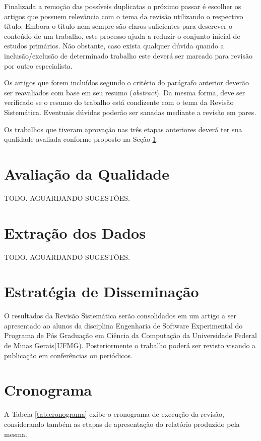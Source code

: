 \documentclass{article}
\begin{document}
Finalizada a remoção das possíveis duplicatas o próximo passar é escolher os
artigos que possuem relevância com o tema da revisão utilizando o respectivo
título. Embora o título nem sempre são claros suficientes para  descrever o conteúdo de um trabalho, este processo ajuda a reduzir o conjunto inicial de
estudos primários. Não obstante, caso exista qualquer dúvida quando a
inclusão/exclusão de determinado trabalho este deverá ser marcado para revisão
por outro especialista.

Os artigos que forem incluídos segundo o critério do parágrafo anterior deverão
ser reavaliados com base em seu resumo (\textit{abstract}). Da mesma forma,
deve ser verificado se o resumo do trabalho está condizente com o tema da
Revisão Sistemática. Eventuais dúvidas poderão ser sanadas mediante a revisão
em pares.

Os trabalhos que tiveram aprovação nas três etapas anteriores deverá ter sua
qualidade avaliada conforme proposto na Seção \ref{sec:qualidade}.

\section{Avaliação da Qualidade}
\label{sec:qualidade}

TODO. AGUARDANDO SUGESTÕES.

\section{Extração dos Dados}
\label{sec:extracao_dados}


TODO. AGUARDANDO SUGESTÕES.


\section{Estratégia de Disseminação}
\label{sec:dissiminacao}
O resultados da Revisão Sistemática serão consolidados em um artigo a ser
apresentado ao alunos da disciplina Engenharia de Software Experimental do
Programa de Pós Graduação em Ciência da Computação da Universidade Federal de
Minas Gerais(UFMG). Posteriormente o trabalho poderá ser revisto visando a
publicação em conferências ou periódicos.
\section{Cronograma}
\label{sec:cronograma}


A Tabela \ref{tab:cronograma} exibe o cronograma de execução da revisão, considerando
também as etapas de apresentação do relatório produzido pela mesma.
\end{document}
